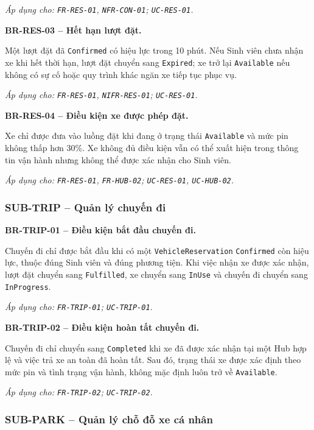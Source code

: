 \textit{Áp dụng cho: \texttt{FR-RES-01}, \texttt{NFR-CON-01}; \texttt{UC-RES-01}.}

\medskip
\noindent\textbf{BR-RES-03 -- Hết hạn lượt đặt.}\par
\nopagebreak[4]
Một lượt đặt đã \texttt{Confirmed} có hiệu lực trong 10 phút. Nếu Sinh viên chưa nhận xe khi hết thời hạn, lượt đặt chuyển sang \texttt{Expired}; xe trở lại \texttt{Available} nếu không có sự cố hoặc quy trình khác ngăn xe tiếp tục phục vụ.

\textit{Áp dụng cho: \texttt{FR-RES-01}, \texttt{NIFR-RES-01}; \texttt{UC-RES-01}.}

\medskip
\noindent\textbf{BR-RES-04 -- Điều kiện xe được phép đặt.}\par
\nopagebreak[4]
Xe chỉ được đưa vào luồng đặt khi đang ở trạng thái \texttt{Available} và mức pin không thấp hơn 30\%. Xe không đủ điều kiện vẫn có thể xuất hiện trong thông tin vận hành nhưng không thể được xác nhận cho Sinh viên.

\textit{Áp dụng cho: \texttt{FR-RES-01}, \texttt{FR-HUB-02}; \texttt{UC-RES-01}, \texttt{UC-HUB-02}.}

\subsubsection{SUB-TRIP -- Quản lý chuyến đi}

\noindent\textbf{BR-TRIP-01 -- Điều kiện bắt đầu chuyến đi.}\par
\nopagebreak[4]
Chuyến đi chỉ được bắt đầu khi có một \texttt{VehicleReservation} \texttt{Confirmed} còn hiệu lực, thuộc đúng Sinh viên và đúng phương tiện. Khi việc nhận xe được xác nhận, lượt đặt chuyển sang \texttt{Fulfilled}, xe chuyển sang \texttt{InUse} và chuyến đi chuyển sang \texttt{InProgress}.

\textit{Áp dụng cho: \texttt{FR-TRIP-01}; \texttt{UC-TRIP-01}.}

\medskip
\noindent\textbf{BR-TRIP-02 -- Điều kiện hoàn tất chuyến đi.}\par
\nopagebreak[4]
Chuyến đi chỉ chuyển sang \texttt{Completed} khi xe đã được xác nhận tại một Hub hợp lệ và việc trả xe an toàn đã hoàn tất. Sau đó, trạng thái xe được xác định theo mức pin và tình trạng vận hành, không mặc định luôn trở về \texttt{Available}.

\textit{Áp dụng cho: \texttt{FR-TRIP-02}; \texttt{UC-TRIP-02}.}

\subsubsection{SUB-PARK -- Quản lý chỗ đỗ xe cá nhân}

